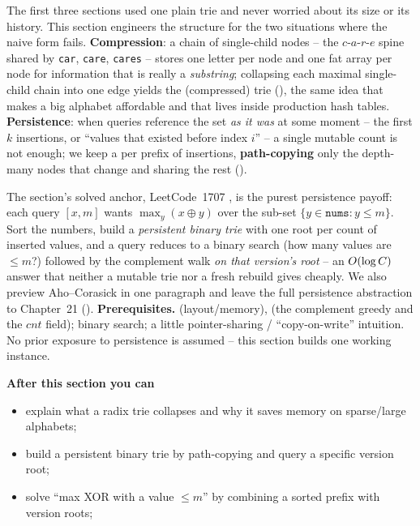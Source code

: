 \begin{topicintro}
The first three sections used one plain trie and never worried about its size or its history. This section
engineers the structure for the two situations where the naive form fails. \textbf{Compression}: a chain of
single-child nodes -- the $c$-$a$-$r$-$e$ spine shared by \texttt{car}, \texttt{care}, \texttt{cares} --
stores one letter per node and one fat array per node for information that is really a \emph{substring};
collapsing each maximal single-child chain into one edge yields the  (compressed) trie
(), the same idea that makes a big alphabet affordable and that lives inside production
hash tables. \textbf{Persistence}: when queries reference the set \emph{as it was} at some moment -- the
first $k$ insertions, or ``values that existed before index $i$'' -- a single mutable count is not enough;
we keep a  per prefix of insertions, \textbf{path-copying} only the depth-many nodes
that change and sharing the rest ().

The section's solved anchor, LeetCode~1707 , is the purest persistence payoff:
each query $[x,m]$ wants $\max_y (x\oplus y)$ over the sub-set $\{y \in \texttt{nums}: y \le m\}$. Sort the
numbers, build a \emph{persistent binary trie} with one root per count of inserted values, and a query
reduces to a binary search (how many values are $\le m$?) followed by the  complement
walk \emph{on that version's root} -- an $O(\log C)$ answer that neither a mutable trie nor a fresh
rebuild gives cheaply. We also preview Aho--Corasick in one paragraph and leave the full persistence
abstraction to Chapter~21 ().
\textbf{Prerequisites.}  (layout/memory),  (the complement greedy
and the $\mathit{cnt}$ field); binary search; a little pointer-sharing / ``copy-on-write'' intuition. No
prior exposure to persistence is assumed -- this section builds one working instance.

\textbf{After this section you can}
\begin{itemize}[nosep]
  \item explain what a radix trie collapses and why it saves memory on sparse/large alphabets; \hfill{}
  \item build a persistent binary trie by path-copying and query a specific version root; \hfill{}
  \item solve ``max XOR with a value $\le m$'' by combining a sorted prefix with version roots; \hfill{}
\end{itemize}
\end{topicintro}

